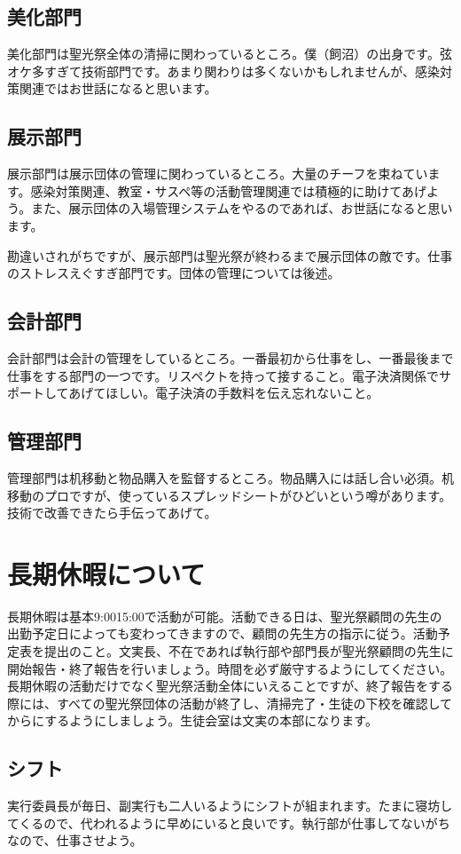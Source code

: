 \documentclass[dvipdfmx,jb5]{jreport}
\begin{document}
\subsection{美化部門}
美化部門は聖光祭全体の清掃に関わっているところ。僕（飼沼）の出身です。弦オケ多すぎて技術部門です。あまり関わりは多くないかもしれませんが、感染対策関連ではお世話になると思います。

\subsection{展示部門}
展示部門は展示団体の管理に関わっているところ。大量のチーフを束ねています。感染対策関連、教室・サスペ等の活動管理関連では積極的に助けてあげよう。また、展示団体の入場管理システムをやるのであれば、お世話になると思います。

勘違いされがちですが、展示部門は聖光祭が終わるまで展示団体の敵です。仕事のストレスえぐすぎ部門です。団体の管理については後述。

\subsection{会計部門}
会計部門は会計の管理をしているところ。一番最初から仕事をし、一番最後まで仕事をする部門の一つです。リスペクトを持って接すること。電子決済関係でサポートしてあげてほしい。電子決済の手数料を伝え忘れないこと。

\subsection{管理部門}
管理部門は机移動と物品購入を監督するところ。物品購入には話し合い必須。机移動のプロですが、使っているスプレッドシートがひどいという噂があります。技術で改善できたら手伝ってあげて。

\section{長期休暇について}
長期休暇は基本9:0015:00で活動が可能。活動できる日は、聖光祭顧問の先生の出勤予定日によっても変わってきますので、顧問の先生方の指示に従う。活動予定表を提出のこと。文実長、不在であれば執行部や部門長が聖光祭顧問の先生に開始報告・終了報告を行いましょう。時間を必ず厳守するようにしてください。長期休暇の活動だけでなく聖光祭活動全体にいえることですが、終了報告をする際には、すべての聖光祭団体の活動が終了し、清掃完了・生徒の下校を確認してからにするようにしましょう。生徒会室は文実の本部になります。

\subsection{シフト}
実行委員長が毎日、副実行も二人いるようにシフトが組まれます。たまに寝坊してくるので、代われるように早めにいると良いです。執行部が仕事してないがちなので、仕事させよう。
\end{document}
